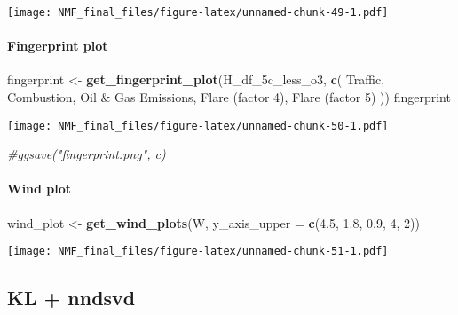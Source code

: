 \documentclass[
]{article}
\newenvironment{Shaded}{\begin{snugshade}}{\end{snugshade}}
\newcommand{\AttributeTok}[1]{\textcolor[rgb]{0.13,0.29,0.53}{#1}}
\newcommand{\CommentTok}[1]{\textcolor[rgb]{0.56,0.35,0.01}{\textit{#1}}}
\newcommand{\DecValTok}[1]{\textcolor[rgb]{0.00,0.00,0.81}{#1}}
\newcommand{\FloatTok}[1]{\textcolor[rgb]{0.00,0.00,0.81}{#1}}
\newcommand{\FunctionTok}[1]{\textcolor[rgb]{0.13,0.29,0.53}{\textbf{#1}}}
\newcommand{\NormalTok}[1]{#1}
\newcommand{\OtherTok}[1]{\textcolor[rgb]{0.56,0.35,0.01}{#1}}
\newcommand{\StringTok}[1]{\textcolor[rgb]{0.31,0.60,0.02}{#1}}
\begin{document}
\texttt{[image: NMF\_final\_files/figure-latex/unnamed-chunk-49-1.pdf]}

\paragraph{Fingerprint plot}\label{fingerprint-plot-2}

\begin{Shaded}
\begin{Highlighting}[]
\NormalTok{fingerprint }\OtherTok{\textless{}{-}} \FunctionTok{get\_fingerprint\_plot}\NormalTok{(H\_df\_5c\_less\_o3, }\FunctionTok{c}\NormalTok{(}
      \StringTok{\textquotesingle{}Traffic\textquotesingle{}}\NormalTok{,}
      \StringTok{\textquotesingle{}Combustion\textquotesingle{}}\NormalTok{,}
      \StringTok{\textquotesingle{}Oil \& Gas Emissions\textquotesingle{}}\NormalTok{,}
      \StringTok{\textquotesingle{}Flare (factor 4)\textquotesingle{}}\NormalTok{,}
      \StringTok{\textquotesingle{}Flare (factor 5)\textquotesingle{}}
\NormalTok{    ))}
\NormalTok{fingerprint}
\end{Highlighting}
\end{Shaded}

\texttt{[image: NMF\_final\_files/figure-latex/unnamed-chunk-50-1.pdf]}

\begin{Shaded}
\begin{Highlighting}[]
\CommentTok{\#ggsave("fingerprint.png", c)}
\end{Highlighting}
\end{Shaded}

\paragraph{Wind plot}\label{wind-plot-2}

\begin{Shaded}
\begin{Highlighting}[]
\NormalTok{wind\_plot }\OtherTok{\textless{}{-}} \FunctionTok{get\_wind\_plots}\NormalTok{(W, }\AttributeTok{y\_axis\_upper =} \FunctionTok{c}\NormalTok{(}\FloatTok{4.5}\NormalTok{, }\FloatTok{1.8}\NormalTok{, }\FloatTok{0.9}\NormalTok{, }\DecValTok{4}\NormalTok{, }\DecValTok{2}\NormalTok{))}
\end{Highlighting}
\end{Shaded}

\texttt{[image: NMF\_final\_files/figure-latex/unnamed-chunk-51-1.pdf]}

\subsection{KL + nndsvd}\label{kl-nndsvd}
\end{document}
